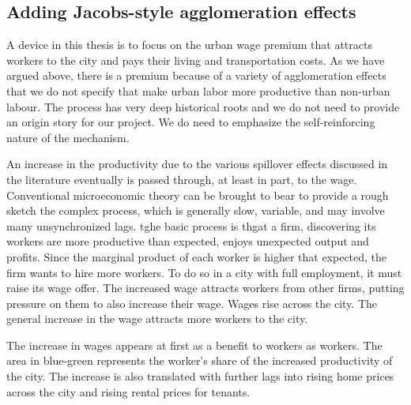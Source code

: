 \subsection{Adding Jacobs-style agglomeration effects}
A device in this thesis is to focus on the urban wage premium that attracts workers to the city and pays their living and transportation costs. As we have argued above, there is a premium because of a variety of agglomeration effects that we do not specify that make urban labor more productive than non-urban labour. The process has very deep historical roots and we do not need to provide an origin story for our project. We do need to emphasize the self-reinforcing nature of the mechanism.

An increase in the productivity due to the various spillover effects discussed in the literature eventually is passed through, at least in part, to the wage. Conventional microeconomic theory can be brought to bear to provide a rough sketch the  complex process, which is generally slow, variable, and may involve many unsynchronized lags.  tghe basic process is thgat a firm, discovering its workers are  more productive than expected, enjoys unexpected output and profits. Since the marginal product of each worker is higher that expected, the firm  wants to hire more workers. To do so in a city with full employment, it must raise its wage offer. The increased wage attracts workers from other firms, putting pressure on them to also increase their wage. Wages rise across the city. The general increase in the wage attracts more workers to the city. 

The increase in wages appears at first as a benefit to workers as workers. The area in blue-green represents the worker's share of the increased productivity of the city. The increase is also translated with further lags into rising home prices across the city and rising rental prices for tenants. 


\begin{center}
\end{center}

